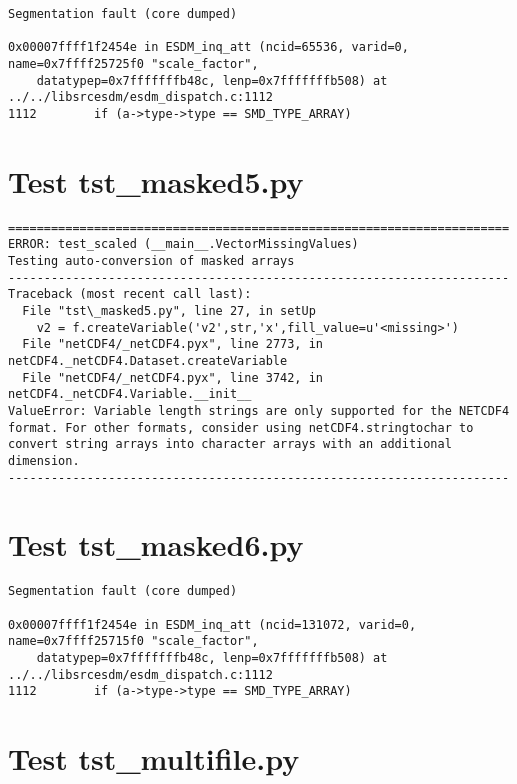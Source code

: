 \begin{verbatim}
Segmentation fault (core dumped)

0x00007ffff1f2454e in ESDM_inq_att (ncid=65536, varid=0, name=0x7ffff25725f0 "scale_factor",
    datatypep=0x7fffffffb48c, lenp=0x7fffffffb508) at ../../libsrcesdm/esdm_dispatch.c:1112
1112	    if (a->type->type == SMD_TYPE_ARRAY)
\end{verbatim}

\section{Test tst\_masked5.py}

\begin{verbatim}
======================================================================
ERROR: test_scaled (__main__.VectorMissingValues)
Testing auto-conversion of masked arrays
----------------------------------------------------------------------
Traceback (most recent call last):
  File "tst\_masked5.py", line 27, in setUp
    v2 = f.createVariable('v2',str,'x',fill_value=u'<missing>')
  File "netCDF4/_netCDF4.pyx", line 2773, in netCDF4._netCDF4.Dataset.createVariable
  File "netCDF4/_netCDF4.pyx", line 3742, in netCDF4._netCDF4.Variable.__init__
ValueError: Variable length strings are only supported for the NETCDF4 format. For other formats, consider using netCDF4.stringtochar to convert string arrays into character arrays with an additional dimension.
----------------------------------------------------------------------

\end{verbatim}

\section{Test tst\_masked6.py}

\begin{verbatim}
Segmentation fault (core dumped)

0x00007ffff1f2454e in ESDM_inq_att (ncid=131072, varid=0, name=0x7ffff25715f0 "scale_factor",
    datatypep=0x7fffffffb48c, lenp=0x7fffffffb508) at ../../libsrcesdm/esdm_dispatch.c:1112
1112	    if (a->type->type == SMD_TYPE_ARRAY)
\end{verbatim}

\section{Test tst\_multifile.py}

